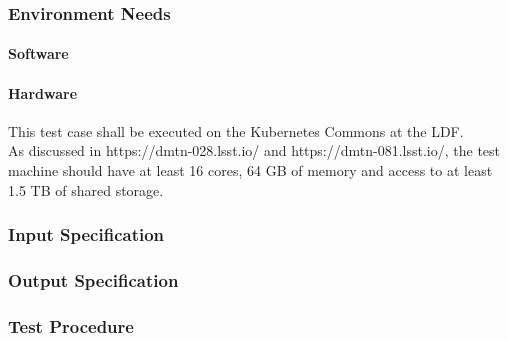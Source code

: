 \subsubsection{Environment Needs}

\paragraph{Software}


\paragraph{Hardware}

This test case shall be executed on the Kubernetes Commons at the LDF.\\
As discussed in https://dmtn-028.lsst.io/ and https://dmtn-081.lsst.io/,
the test machine should have at least 16 cores, 64 GB of memory and
access to at least 1.5 TB of shared storage.



\subsubsection{Input Specification}


\subsubsection{Output Specification}


\subsubsection{Test Procedure}

